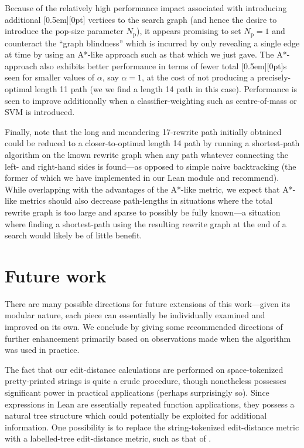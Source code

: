 \documentclass[a4paper]{article}
\theoremstyle{plain}
\theoremstyle{definition}
\newcommand{\xx}[1]{{\colorbox{gray!15}{\raisebox{0em}[0.5em][0pt]{\makebox[\width-0.4em]{\texttt{#1}}}}}}
\newcommand{\expr}{\xx{expr}}
\begin{document}
Because of the relatively high performance impact associated with introducing additional \expr{} vertices to the search graph (and hence the desire to introduce the pop-size parameter $N_\text{p}$), it appears promising to set $N_\text{p} = 1$ and counteract the ``graph blindness'' which is incurred by only revealing a single edge at time by using an A*-like approach such as that which we just gave. The A*-approach also exhibits better performance in terms of fewer total \expr{}s seen for smaller values of $\alpha$, say $\alpha = 1$, at the cost of not producing a precisely-optimal length 11 path (we we find a length 14 path in this case). Performance is seen to improve additionally when a classifier-weighting such as centre-of-mass or SVM is introduced.

Finally, note that the long and meandering 17-rewrite path initially obtained could be reduced to a closer-to-optimal length 14 path by running a shortest-path algorithm on the known rewrite graph when any path whatever connecting the left- and right-hand sides is found---as opposed to simple naive backtracking (the former of which we have implemented in our Lean module and recommend). While overlapping with the advantages of the A*-like metric, we expect that A*-like metrics should also decrease path-lengths in situations where the total rewrite graph is too large and sparse to possibly be fully known---a situation where finding a shortest-path using the resulting rewrite graph at the end of a search would likely be of little benefit.

\section{Future work}

There are many possible directions for future extensions of this work---given its modular nature, each piece can essentially be individually examined and improved on its own. We conclude by giving some recommended directions of further enhancement primarily based on observations made when the algorithm was used in practice.

The fact that our edit-distance calculations are performed on space-tokenized pretty-printed strings is quite a crude procedure, though nonetheless possesses significant power in practical applications (perhaps surprisingly so). Since expressions in Lean are essentially repeated function applications, they possess a natural tree structure which could potentially be exploited for additional information. One possibility is to replace the string-tokenized edit-distance metric with a labelled-tree edit-distance metric, such as that of \cite{pawlik2011rted}.
\end{document}
